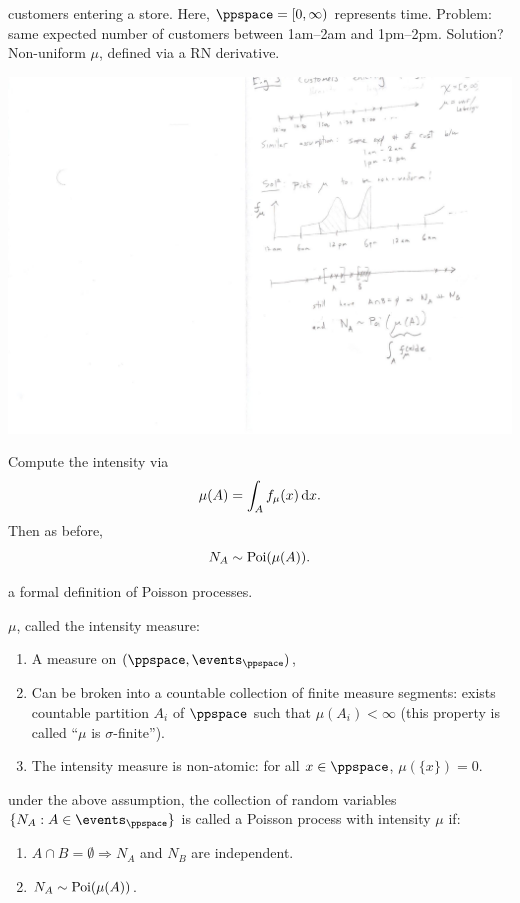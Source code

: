 \documentclass{article}
\begin{document}
 customers entering a store. Here, $\ppspace = [0, \infty)$ represents time. Problem: same expected number of customers between 1am--2am and 1pm--2pm. Solution? Non-uniform $\mu$, defined via a RN derivative. 
\begin{center}
	\includegraphics[width=0.6\linewidth]{figures/pp-non-unif} 
\end{center}
Compute the intensity via
\[ \mu(A) = \int_A f_\mu(x) \,\mathrm{d} x. \]
Then as before,
\[ N_A \sim \operatorname{Poi}(\mu(A)). \]

 a formal definition of Poisson processes. 

 $\mu$, called the intensity measure:
\begin{enumerate}
  \item A measure on $(\ppspace, \events_\ppspace)$,
  \item Can be broken into a countable collection of finite measure segments: exists countable partition $A_i$ of $\ppspace$ such that $\mu(A_i) < \infty$ (this property is called ``$\mu$ is  $\sigma$-finite'').
  \item The intensity measure is non-atomic: for all $x \in \ppspace$, $\mu(\{x\}) = 0$.
\end{enumerate}

 under the above assumption, the collection of random variables $\{N_A : A \in \events_\ppspace\}$ is called a Poisson process with intensity $\mu$ if:
\begin{enumerate}
  \item $A \cap B = \emptyset \Longrightarrow N_A$ and $N_B$ are independent.
  \item $N_A \sim \operatorname{Poi}(\mu(A))$.
\end{enumerate}
\end{document}
